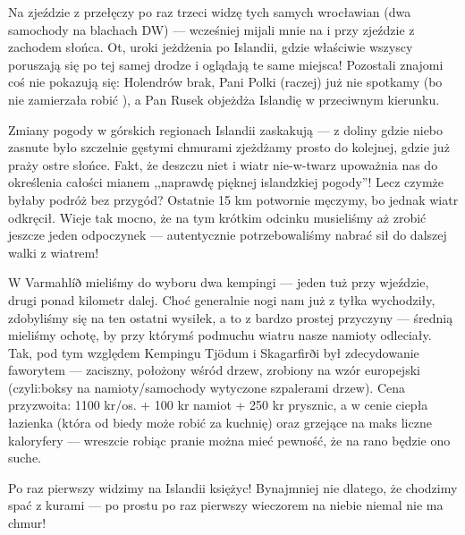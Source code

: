Na zjeździe z przełęczy po raz trzeci widzę tych samych wrocławian (dwa samochody na blachach DW) --- wcześniej mijali mnie na  i przy zjeździe z zachodem słońca. Ot, uroki jeżdżenia po Islandii, gdzie właściwie wszyscy poruszają się po tej samej drodze i oglądają te same miejsca! Pozostali znajomi coś nie pokazują się: Holendrów brak, Pani Polki (raczej) już nie spotkamy (bo nie zamierzała robić ), a Pan Rusek objeżdża Islandię w przeciwnym kierunku.

Zmiany pogody w górskich regionach Islandii zaskakują --- z doliny gdzie niebo zasnute było szczelnie gęstymi chmurami zjeżdżamy prosto do kolejnej, gdzie już praży ostre słońce. Fakt, że deszczu niet i wiatr nie-w-twarz upoważnia nas do określenia całości mianem ,,naprawdę pięknej islandzkiej pogody''! Lecz czymże byłaby podróż bez przygód? Ostatnie 15 km potwornie męczymy, bo jednak wiatr odkręcił. Wieje tak mocno, że na tym krótkim odcinku musieliśmy aż zrobić jeszcze jeden odpoczynek --- autentycznie potrzebowaliśmy nabrać sił do dalszej walki z wiatrem!

W Varmahlíð mieliśmy do wyboru dwa kempingi --- jeden tuż przy wjeździe, drugi ponad kilometr dalej. Choć generalnie nogi nam już z tyłka wychodziły, zdobyliśmy się na ten ostatni wysiłek, a to z bardzo prostej przyczyny --- średnią mieliśmy ochotę, by przy którymś podmuchu wiatru nasze namioty odleciały. Tak, pod tym względem Kempingu Tjödum i Skagarfirði był zdecydowanie faworytem --- zaciszny, położony wśród drzew, zrobiony na wzór europejski (czyli:boksy na namioty/samochody wytyczone szpalerami drzew). Cena przyzwoita: 1100 kr/os. + 100 kr namiot + 250 kr prysznic, a w cenie ciepła łazienka (która od biedy może robić za kuchnię) oraz grzejące na maks liczne kaloryfery --- wreszcie robiąc pranie można mieć pewność, że na rano będzie ono suche.

Po raz pierwszy widzimy na Islandii księżyc! Bynajmniej nie dlatego, że chodzimy spać z kurami --- po prostu po raz pierwszy wieczorem na niebie niemal nie ma chmur!
